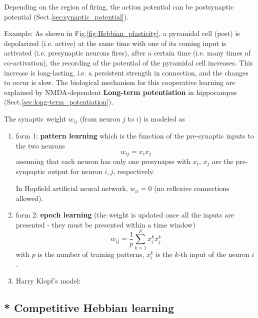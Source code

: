 Depending on the region of firing, the action potential can be postsynaptic
potential (Sect.\ref{sec:synaptic_potential}).

Example:
As shown in Fig.\ref{fig:Hebbian_plasticity}, a pyramidal cell (post) is
depolarized (i.e. active) at the same time with one of its coming input is
activated (i.e. presynaptic neurons fires), after a certain time (i.e. many
times of co-activation), the recording of the potential of the pyramidal cell
increases. This increase is long-lasting, i.e. a persistent strength in
connection, and the changes to occur is slow.
The biological mechanism for this cooperative learning are explained by
NMDA-dependent {\bf Long-term potentiation} in hippocampus
(Sect.\ref{sec:long-term_potentiation}).

 
The synaptic weight $w_{ij}$ (from neuron $j$ to $i$) is modeled as
\begin{enumerate}
  \item form 1: {\bf pattern learning} which is the 
  function of the pre-synaptic inputs to the two
  neurons
\[
w_{ij} = x_i x_j
\]
assuming that each neuron has only one presynapse with $x_i$, $x_j$ are the
pre-synpaptic output for neuron $i, j$, respectively.

In Hopfield artificial neural network, $w_{ii}= 0$ (no reflexive connections
allowed).

  \item form 2: {\bf epoch learning} (the weight is updated once all the inputs
  are presented - they must be presented within a time window)
\[
w_{ij} = \frac{1}{p} \sum^p_{k=1} x_i^k x_j^k
\]
with $p$ is the number of training patterns, $x_i^k$ is the $k$-th input of the
neuron $i$.
 
   \item Harry Klopf's model:   
\end{enumerate}

\subsection{* Competitive Hebbian learning}
\label{sec:compatitive_learning}

